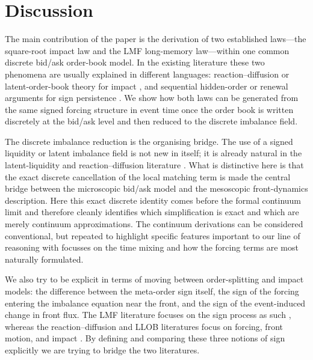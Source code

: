 \documentclass[5p,final]{elsarticle}
\begin{document}
\section{Discussion}
\label{sec:discussion}

The main contribution of the paper is the derivation of two established laws---the square-root impact law and the LMF long-memory law---within one common discrete bid/ask order-book model. In the existing literature these two phenomena are usually explained in different languages: reaction--diffusion or latent-order-book theory for impact \citep{toth2011anomalous,donier2015fully,benzaquen2018multi,bouchaud2018tqp}, and sequential hidden-order or renewal arguments for sign persistence \citep{lillo2005theory,sato2023prl,sato2024jsp}. We show how both laws can be generated from the same signed forcing structure in event time once the order book is written discretely at the bid/ask level and then reduced to the discrete imbalance field.

The discrete imbalance reduction is the organising bridge. The use of a signed liquidity or latent imbalance field is not new in itself; it is already natural in the latent-liquidity and reaction--diffusion literature \citep{toth2011anomalous,donier2015fully,mastromatteo2014latent}. What is distinctive here is that the exact discrete cancellation of the local matching term is made the central bridge between the microscopic bid/ask model and the mesoscopic front-dynamics description. Here this exact discrete identity comes before the formal continuum limit and therefore cleanly identifies which simplification is exact and which are merely continuum approximations. The continuum derivations can be considered conventional, but repeated to highlight specific features important to our line of reasoning with focusses on the time mixing and how the forcing terms are most naturally formulated. 

We also try to be explicit in terms of moving between order-splitting and impact models: the difference between the meta-order sign itself, the sign of the forcing entering the imbalance equation near the front, and the sign of the event-induced change in front flux. The LMF literature focuses on the sign process as such \citep{lillo2005theory,sato2023prl,sato2024jsp}, whereas the reaction--diffusion and LLOB literatures focus on forcing, front motion, and impact \citep{donier2015fully,benzaquen2018multi,bouchaud2018tqp}. By defining and comparing these three notions of sign explicitly we are trying to bridge the two literatures.
\end{document}
